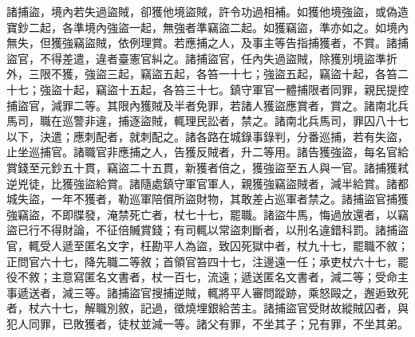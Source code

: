 \begin{pinyinscope}
 諸捕盜，境內若失過盜賊，卻獲他境盜賊，許令功過相補。如獲他境強盜，或偽造寶鈔二起，各準境內強盜一起，無強者準竊盜二起。如獲竊盜，準亦如之。如境內無失，但獲強竊盜賊，依例理賞。若應捕之人，及事主等告指捕獲者，不賞。諸捕盜官，不得差遣，違者臺憲官糾之。諸捕盜官，任內失過盜賊，除獲別境盜準折外，三限不獲，強盜三起，竊盜五起，各笞一十七；強盜五起，竊盜十起，各笞二十七；強盜十起，竊盜十五起，各笞三十七。鎮守軍官一體捕限者同罪，親民提控捕盜官，減罪二等。其限內獲賊及半者免罪，若諸人獲盜應賞者，賞之。諸南北兵馬司，職在巡警非違，捕逐盜賊，輒理民訟者，禁之。諸南北兵馬司，罪囚八十七以下，決遣；應刺配者，就刺配之。諸各路在城錄事錄判，分番巡捕，若有失盜，止坐巡捕官。諸職官非應捕之人，告獲反賊者，升二等用。諸告獲強盜，每名官給賞錢至元鈔五十貫，竊盜二十五貫，新獲者倍之，獲強盜至五人與一官。諸捕獲弒逆兇徒，比獲強盜給賞。諸隨處鎮守軍官軍人，親獲強竊盜賊者，減半給賞。諸都城失盜，一年不獲者，勒巡軍陪償所盜財物，其敢差占巡軍者禁之。諸捕盜官捕獲強竊盜，不即牒發，淹禁死亡者，杖七十七，罷職。諸盜牛馬，悔過放還者，以竊盜已行不得財論，不征倍贓賞錢；有司輒以常盜刺斷者，以刑名違錯科罰。諸捕盜官，輒受人遞至匿名文字，枉勘平人為盜，致囚死獄中者，杖九十七，罷職不敘；正問官六十七，降先職二等敘；首領官笞四十七，注邊遠一任；承吏杖六十七，罷役不敘；主意寫匿名文書者，杖一百七，流遠；遞送匿名文書者，減二等；受命主事遞送者，減三等。諸捕盜官搜捕逆賊，輒將平人審問蹤跡，乘怒毆之，邂逅致死者，杖六十七，解職別敘，記過，徵燒埋銀給苦主。諸捕盜官受財故縱賊囚者，與犯人同罪，已敗獲者，徒杖並減一等。諸父有罪，不坐其子；兄有罪，不坐其弟。




\end{pinyinscope}
